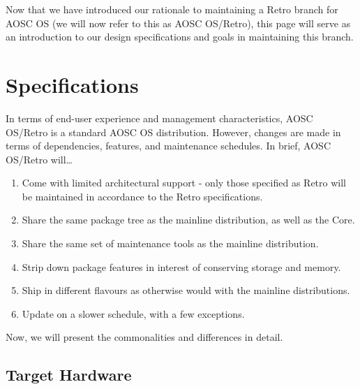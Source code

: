 


    \raggedbottom
    \makecoverpage

    \setcounter{tocdepth}{1}
    \sffamily{\tableofcontents}
    \clearpage

    \hspace{40mm}

    \large
    \vspace{40mm}
    Now that we have introduced our rationale to maintaining a Retro branch for AOSC OS
    (we will now refer to this as AOSC OS/Retro), this page will serve as an introduction
    to our design specifications and goals in maintaining this branch.
    \vfill

    \pagestyle{plain}
    \rmfamily\mdseries\normalsize

    \chapter{Specifications}

    In terms of end-user experience and management characteristics, AOSC OS/Retro is a standard AOSC OS distribution.
    However, changes are made in terms of dependencies, features, and maintenance schedules. In brief, AOSC OS/Retro will\ldots

    \begin{enumerate}
        \item Come with limited architectural support - only those specified
            as Retro will be maintained in accordance to the Retro specifications.
        \item Share the same package tree as the mainline distribution, as well as the Core.
        \item Share the same set of maintenance tools as the mainline distribution.
        \item Strip down package features in interest of conserving storage and memory.
        \item Ship in different flavours as otherwise would with the mainline distributions.
        \item Update on a slower schedule, with a few exceptions.
    \end{enumerate}

    Now, we will present the commonalities and differences in detail.




    \section{Target Hardware}
    
